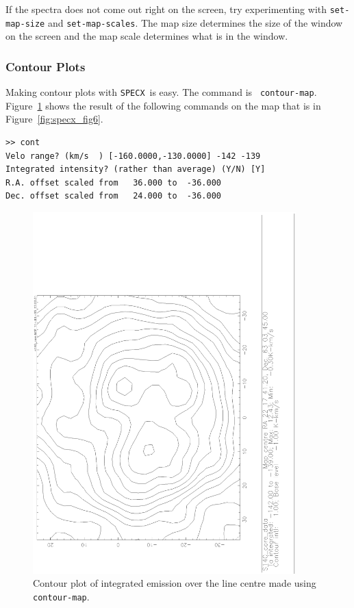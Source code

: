 \documentclass[11pt,twoside]{article}
\newcommand{\SPECX}{{\tt SPECX}}
\begin{document}
If the spectra does not come out right on the screen, try
experimenting with {\tt set-map-size} and {\tt set-map-scales}.  The
map size determines the size of the window on the screen and the map
scale determines what is in the window.

\subsubsection{Contour Plots}
\label{sec:specx_13.4}
Making contour plots with \SPECX\ is easy.  The command is {\tt
contour-map}.  Figure~\ref{fig:specx_fig7} shows the result of the
following commands on the map that is in Figure~\ref{fig:specx_fig6}.

\begin{verbatim}
>> cont
Velo range? (km/s  ) [-160.0000,-130.0000] -142 -139
Integrated intensity? (rather than average) (Y/N) [Y]
R.A. offset scaled from   36.000 to  -36.000
Dec. offset scaled from   24.000 to  -36.000
\end{verbatim}

\begin{figure}[htb]
\centering
\includegraphics[angle=-90,width=4in]{sc8_cont.ps}
\vspace*{-0.5cm}
\begin{center}
\begin{minipage}[t]{5in}
\caption[Contour plot example]
{\small{Contour plot of integrated emission over the line centre made
using {\tt contour-map}.}  }
\label{fig:specx_fig7}
\end{minipage}
\end{center}
\end{figure}
\end{document}
